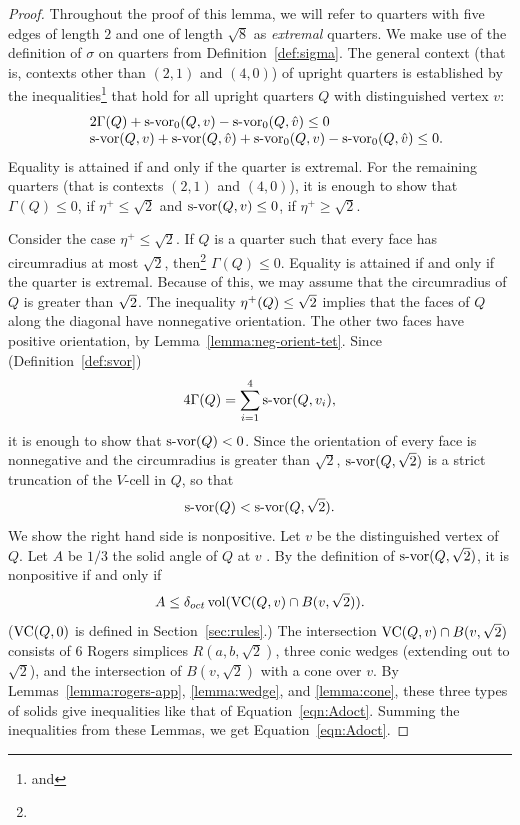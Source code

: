 \begin{proof}  Throughout the proof of this lemma, we will refer to
quarters with five edges of length $2$ and one of length $\sqrt8$
as {\it extremal} quarters.  We make use
of the definition of $\sigma$ on quarters from
Definition~\ref{def:sigma}. The general context (that is, contexts
other than $(2,1)$ and $(4,0)$) of upright quarters is established
by the inequalities\footnote{ and
} that hold for all upright quarters $Q$ with
distinguished vertex $v$:
    $$
    \begin{array}{lll}
    &2\Gamma(Q) + \operatorname{s-vor}_0(Q,v) - \operatorname{s-vor}_0(Q,\hat v) \le 0\\
    &\operatorname{s-vor}(Q,v) + \operatorname{s-vor}(Q,\hat v) +\operatorname{s-vor}_0(Q,v) - \operatorname{s-vor}_0(Q,\hat v)\le0.
    \end{array}
    $$
Equality is attained if and only if the quarter is extremal.
For the remaining quarters (that is contexts $(2,1)$ and $(4,0)$),
it is enough to show that $\Gamma(Q)\le0$, if $\eta^+\le\sqrt2$
and $\operatorname{s-vor}(Q,v)\le0$, if $\eta^+\ge\sqrt2$.

Consider the case $\eta^+\le\sqrt2$.  If $Q$ is a quarter such that
every face has circumradius at most $\sqrt2$,
then\footnote{} $\Gamma(Q)\le0$.  Equality is
attained if and only if the quarter is extremal.
Because of this, we may assume that the circumradius of $Q$ is
greater than $\sqrt2$. The inequality $\eta^+(Q)\le\sqrt2$ implies
that the faces of $Q$ along the diagonal have nonnegative
orientation. The other two faces have positive orientation, by
Lemma~\ref{lemma:neg-orient-tet}. Since
(Definition~\ref{def:svor})
    $$4\Gamma(Q)=\sum_{i=1}^4 \operatorname{s-vor}(Q,v_i),$$
it is enough to show that $\operatorname{s-vor}(Q)<0$.  Since the orientation of
every face is nonnegative and the circumradius is greater than
$\sqrt2$, $\operatorname{s-vor}(Q,\sqrt2)$ is a strict truncation of the $V$-cell
in $Q$, so that
    $$\operatorname{s-vor}(Q)<\operatorname{s-vor}(Q,\sqrt2).$$
We show the right hand side is nonpositive.  Let $v$ be the
distinguished vertex of $Q$.  Let $A$ be $1/3$ the solid angle of
$Q$ at $v$ . By the definition of $\operatorname{s-vor}(Q,\sqrt2)$, it is
nonpositive if and only if
    \begin{equation}
        A\le \delta_{oct} \,{\operatorname{vol}}({\operatorname{VC}}(Q,v)\cap B(v,\sqrt2)).
        \label{eqn:Adoct}
    \end{equation}
(${\operatorname{VC}}(Q,0)$ is defined in Section~\ref{sec:rules}.) The
intersection ${\operatorname{VC}}(Q,v)\cap B(v,\sqrt2)$ consists of $6$ Rogers
simplices $R(a,b,\sqrt2)$, three conic wedges (extending out to
$\sqrt2$), and the intersection of $B(v,\sqrt2)$ with a cone over
$v$. By Lemmas~\ref{lemma:rogers-app}, \ref{lemma:wedge}, and
\ref{lemma:cone}, these three types of solids give inequalities
like that of Equation~\ref{eqn:Adoct}. Summing the inequalities
from these Lemmas, we get Equation~\ref{eqn:Adoct}.


\end{proof}
